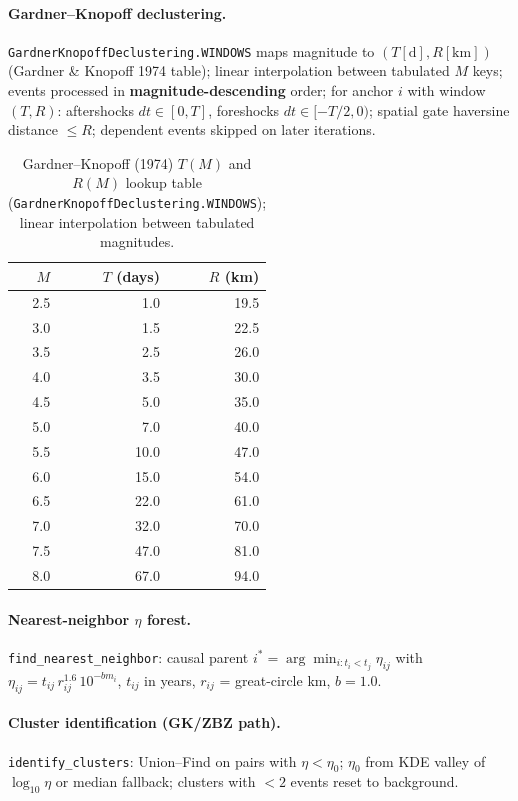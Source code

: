 \documentclass[draft]{agujournal2019}
\begin{document}
\paragraph{Gardner--Knopoff declustering.}
\texttt{GardnerKnopoffDeclustering.WINDOWS} maps magnitude to
$(T[\mathrm{d}], R[\mathrm{km}])$ (Gardner \& Knopoff 1974 table);
linear interpolation between tabulated $M$ keys; events processed in
\textbf{magnitude-descending} order; for anchor $i$ with window
$(T, R)$: aftershocks $dt \in [0, T]$, foreshocks $dt \in [-T/2, 0)$;
spatial gate haversine distance $\le R$; dependent events skipped on
later iterations.

\begin{table}[htbp]
\centering
\caption{Gardner--Knopoff (1974) $T(M)$ and $R(M)$ lookup table
(\texttt{GardnerKnopoffDeclustering.WINDOWS}); linear interpolation
between tabulated magnitudes.}
\label{tab:gk_windows}
\small
\begin{tabular}{rrr}
\hline
$M$ & $T$ (days) & $R$ (km) \\
\hline
2.5 & 1.0 & 19.5 \\
3.0 & 1.5 & 22.5 \\
3.5 & 2.5 & 26.0 \\
4.0 & 3.5 & 30.0 \\
4.5 & 5.0 & 35.0 \\
5.0 & 7.0 & 40.0 \\
5.5 & 10.0 & 47.0 \\
6.0 & 15.0 & 54.0 \\
6.5 & 22.0 & 61.0 \\
7.0 & 32.0 & 70.0 \\
7.5 & 47.0 & 81.0 \\
8.0 & 67.0 & 94.0 \\
\hline
\end{tabular}
\end{table}

\paragraph{Nearest-neighbor $\eta$ forest.}
\texttt{find\_nearest\_neighbor}: causal parent
$i^* = \arg\min_{i: t_i < t_j} \eta_{ij}$ with
$\eta_{ij} = t_{ij}\, r_{ij}^{1.6}\, 10^{-b m_i}$,
$t_{ij}$ in years, $r_{ij}$ = great-circle km, $b=1.0$.

\paragraph{Cluster identification (GK/ZBZ path).}
\texttt{identify\_clusters}: Union--Find on pairs with
$\eta < \eta_0$; $\eta_0$ from KDE valley of $\log_{10}\eta$ or median
fallback; clusters with $<2$ events reset to background.
\end{document}
